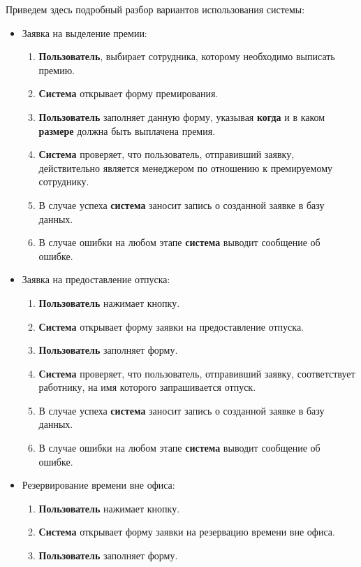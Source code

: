 Приведем здесь подробный разбор вариантов использования системы:
\begin{itemize}
    \item Заявка на выделение премии:
    \begin{enumerate}
        \item \textbf{Пользователь}, выбирает сотрудника, которому необходимо выписать премию. 
        \item \textbf{Система} открывает форму премирования.
        \item \textbf{Пользователь} заполняет данную форму, указывая \textbf{когда} и в каком \textbf{размере} должна быть выплачена 
            премия.
        \item \textbf{Система} проверяет, что пользователь, отправивший заявку, действительно является менеджером по отношению к 
            премируемому сотруднику.
        \item В случае успеха \textbf{система} заносит запись о созданной заявке в базу данных.
        \item В случае ошибки на любом этапе \textbf{система} выводит сообщение об ошибке.
    \end{enumerate}
    \item Заявка на предоставление отпуска:
    \begin{enumerate}
        \item \textbf{Пользователь} нажимает кнопку.
        \item \textbf{Система} открывает форму заявки на предоставление отпуска.
        \item \textbf{Пользователь} заполняет форму.
        \item \textbf{Система} проверяет, что пользователь, отправивший заявку, соответствует работнику, на имя которого запрашивается 
            отпуск.
        \item В случае успеха \textbf{система} заносит запись о созданной заявке в базу данных.
        \item В случае ошибки на любом этапе \textbf{система} выводит сообщение об ошибке.
    \end{enumerate}
    \item Резервирование времени вне офиса:
    \begin{enumerate}
        \item \textbf{Пользователь} нажимает кнопку.
        \item \textbf{Система} открывает форму заявки на резервацию времени вне офиса.
        \item \textbf{Пользователь} заполняет форму.

\end{enumerate}
\end{itemize}
